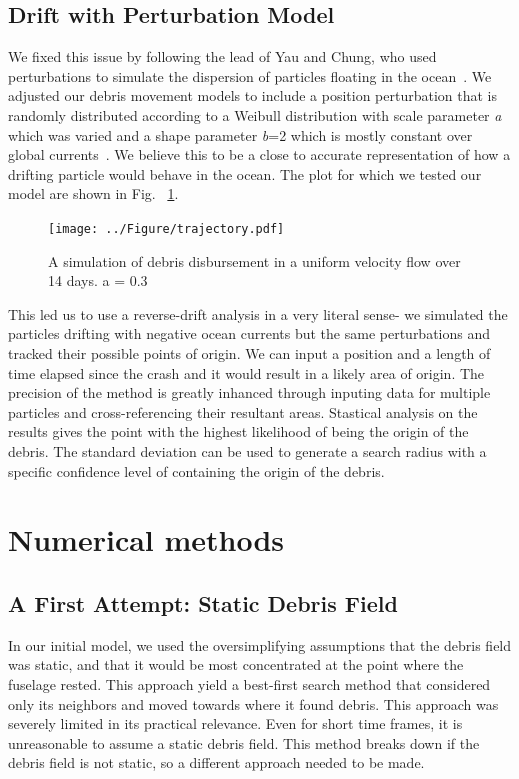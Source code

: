 \documentclass[pre,12pt]{revtex4-1}
\begin{document}
\subsection{Drift with Perturbation Model}

We fixed this issue by following the lead of Yau and Chung, who used perturbations to simulate the dispersion of particles floating in the ocean~\cite{DriftingObjects}. We adjusted our debris movement models to include a position perturbation that is randomly distributed according to a Weibull distribution with scale parameter \textit{a} which was varied and a shape parameter \textit{b}=2 which is mostly constant over global currents~\cite{SurfaceCurrents}. We believe this to be a close to accurate representation of how a drifting particle would behave in the ocean. The plot for which we tested our model are shown in Fig. ~\ref{CurrentFlows}.
\begin{figure}[htbp]
\begin{center}
\texttt{[image: ../Figure/trajectory.pdf]}
\caption{A simulation of debris disbursement in a uniform velocity flow over 14 days. a = 0.3}
\label{CurrentFlows}
\end{center}
\end{figure}
This led us to use a reverse-drift analysis in a very literal sense- we simulated the particles drifting with negative ocean currents but the same perturbations and tracked their possible points of origin. We can input a position and a length of time elapsed since the crash and it would result in a likely area of origin. The precision of the method is greatly inhanced through inputing data for multiple particles and cross-referencing their resultant areas. Stastical analysis on the results gives the point with the highest likelihood of being the origin of the debris. The standard deviation can be used to generate a search radius with a specific confidence level of containing the origin of the debris.

\section{Numerical methods}\label{Numerics}
\subsection{A First Attempt: Static Debris Field}
In our initial model, we used the oversimplifying assumptions that the debris field was static, and that it would be most concentrated at the point where the fuselage rested. This approach yield a best-first search method that considered only its neighbors and moved towards where it found debris. This approach was severely limited in its practical relevance. Even for short time frames, it is unreasonable to assume a static debris field. This method breaks down if the debris field is not static, so a different approach needed to be made.
\end{document}
